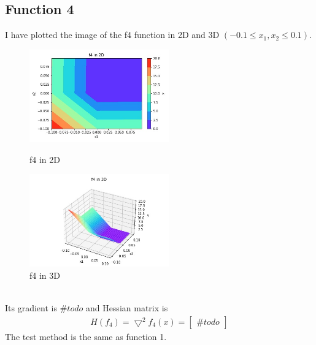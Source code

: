 \documentclass[a4paper,12pt]{article}
\begin{document}
\subsection{Function 4}
I have plotted the image of the f4 function in 2D and 3D $(-0.1 \leq x_1, x_2 \leq 0.1)$.\\
\begin{figure}[htbp]
\centering
\begin{minipage}[t]{0.48\textwidth}
\centering
\includegraphics[width=6cm]{f4_2d.jpg}
\caption{f4 in 2D}
\end{minipage}
\begin{minipage}[t]{0.48\textwidth}
\centering
\includegraphics[width=6cm]{f4_3d.jpg}
\caption{f4 in 3D}
\end{minipage}
\end{figure}\\
Its gradient is $\#todo$ and Hessian matrix is 
\begin{align*}
H(f_4) = \bigtriangledown^2 f_4(x) = 
\begin{bmatrix}
\#todo
\end{bmatrix}
\end{align*}
The test method is the same as function 1.
\end{document}
